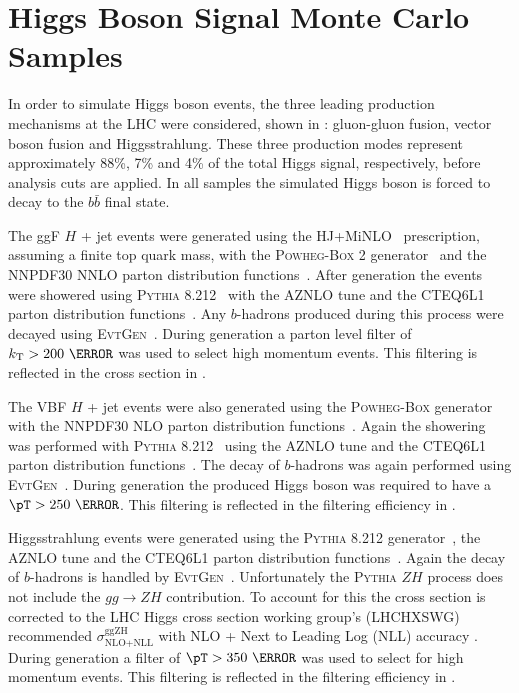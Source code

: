\section{Higgs Boson Signal Monte Carlo Samples} \label{sec:data:signal_mc}

In order to simulate Higgs boson events, the three leading production
mechanisms at the LHC were considered, shown in :
gluon-gluon fusion, vector boson fusion and Higgsstrahlung.  These three
production modes represent approximately 88\%, 7\% and 4\% of the total Higgs
signal, respectively, before analysis cuts are applied.  In all samples the
simulated Higgs boson is forced to decay to the $b\bar{b}$ final state.
 
The ggF $H$ + jet events were generated using the HJ+MiNLO~\cite{Hamilton2015}
prescription, assuming a finite top quark mass, with the \textsc{Powheg-Box} 2
generator~\cite{Campbell2012} and the NNPDF30 NNLO parton distribution
functions~\cite{Hamilton:2012rf}.  After generation the events were showered
using \textsc{Pythia} 8.212~\cite{Sjostrand:2014zea} with the AZNLO tune and
the CTEQ6L1 parton distribution functions~\cite{Pumplin:2002vw}. Any
$b$-hadrons produced during this process were decayed using
\textsc{EvtGen}~\cite{LANGE2001152}. During generation a parton level filter of
$k_{\text{T}} > 200~\GeV$ was used to select high momentum events.  This filtering is
reflected in the cross section in .

The VBF $H$ + jet events were also generated using the \textsc{Powheg-Box}
generator~\cite{Nason:2009ai} with the NNPDF30 NLO parton distribution
functions~\cite{Hamilton:2012rf}. Again the showering was performed with
\textsc{Pythia} 8.212~\cite{Sjostrand:2014zea} using the AZNLO tune and the
CTEQ6L1 parton distribution functions~\cite{Pumplin:2002vw}.  The decay of
$b$-hadrons was again performed using \textsc{EvtGen}~\cite{LANGE2001152}.
During generation the produced Higgs boson was required to have a $\pT >
250~\GeV$.  This filtering is reflected in the filtering efficiency in
.

Higgsstrahlung events were generated using the \textsc{Pythia} 8.212
generator~\cite{Sjostrand:2014zea}, the AZNLO tune and the CTEQ6L1 parton
distribution functions~\cite{Pumplin:2002vw}.  Again the decay of $b$-hadrons
is handled by \textsc{EvtGen}~\cite{LANGE2001152}. Unfortunately the
\textsc{Pythia} $ZH$ process does not include the $gg \rightarrow ZH$
contribution.  To account for this the cross section is corrected to the LHC
Higgs cross section working group's (LHCHXSWG) recommended
$\sigma_{\text{NLO+NLL}}^{\text{ggZH}}$ with NLO + Next to Leading Log (NLL)
accuracy \cite{MelladoGarcia:2150771}. During generation a filter of $\pT >
350~\GeV$ was used to select for high momentum events. This
filtering is reflected in the filtering efficiency in .

